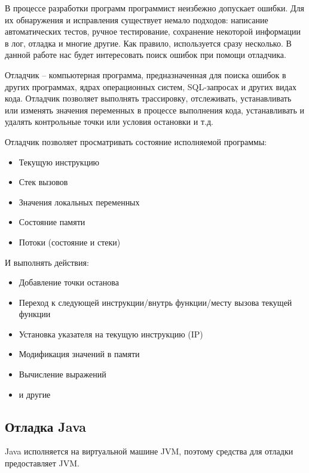В процессе разработки программ программист неизбежно допускает ошибки. Для их обнаружения и исправления существует немало подходов: написание автоматических тестов, ручное тестирование, сохранение некоторой информации в лог, отладка и многие другие. Как правило, используется сразу несколько. В данной работе нас будет интересовать поиск ошибок при помощи отладчика.

\begin{definition}\label{debugger:definition}
	Отладчик --  компьютерная программа, предназначенная для поиска ошибок в других программах, ядрах операционных систем, SQL-запросах и других видах кода. Отладчик позволяет выполнять трассировку, отслеживать, устанавливать или изменять значения переменных в процессе выполнения кода, устанавливать и удалять контрольные точки или условия остановки и т.д.\cite{wiki:debugger}
\end{definition}

\noindent Отладчик позволяет просматривать состояние исполняемой программы:

\begin{itemize}
	\item Текущую инструкцию
	\item Стек вызовов
	\item Значения локальных переменных
	\item Состояние памяти
	\item Потоки (состояние и стеки)
\end{itemize}

\noindent И выполнять действия:

\begin{itemize}
	\item Добавление точки останова
	\item Переход к следующей инструкции/внутрь функции/месту вызова текущей функции
	\item Установка указателя на текущую инструкцию (IP)
	\item Модификация значений в памяти
	\item Вычисление выражений
	\item и другие
\end{itemize}

\subsection{Отладка Java}

Java исполняется на виртуальной машине JVM, поэтому средства для отладки предоставляет 
JVM.

